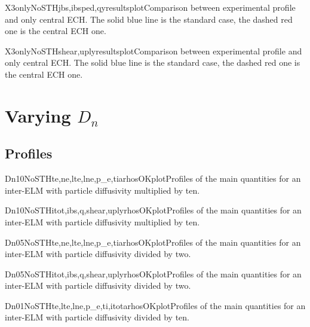\begin{AllFigs}{X3onlyNoST}{H}{}{jbs,ibsped,q}{y}{resultsplot}{Comparison between experimental profile and only central ECH. The solid blue line is the standard case, the dashed red one is the central ECH one.}
\end{AllFigs}

\begin{AllFigs}{X3onlyNoST}{H}{}{shear,upl}{y}{resultsplot}{Comparison between experimental profile and only central ECH. The solid blue line is the standard case, the dashed red one is the central ECH one.}
\end{AllFigs}

\section{Varying $D_n$}\label{sec:app:graphs:recovery:Dn}
\subsection{Profiles}\label{sec:app:graphs:recovery:Dn:profs}
\begin{AllFigs}{Dn10NoST}{H}{}{te,ne,lte,lne,p_e,ti}{a}{rhosOKplot}{Profiles of the main quantities for an inter-ELM with particle diffusivity multiplied by ten.}
\end{AllFigs}

\begin{AllFigs}{Dn10NoST}{H}{}{itot,ibs,q,shear,upl}{y}{rhosOKplot}{Profiles of the main quantities for an inter-ELM with particle diffusivity multiplied by ten.}
\end{AllFigs}

\begin{AllFigs}{Dn05NoST}{H}{}{te,ne,lte,lne,p_e,ti}{a}{rhosOKplot}{Profiles of the main quantities for an inter-ELM with particle diffusivity divided by two.}
\end{AllFigs}

\begin{AllFigs}{Dn05NoST}{H}{}{itot,ibs,q,shear,upl}{y}{rhosOKplot}{Profiles of the main quantities for an inter-ELM with particle diffusivity divided by two.}
\end{AllFigs}

\begin{AllFigs}{Dn01NoST}{H}{}{te,lte,lne,p_e,ti,itot}{a}{rhosOKplot}{Profiles of the main quantities for an inter-ELM with particle diffusivity divided by ten.}
\end{AllFigs}


